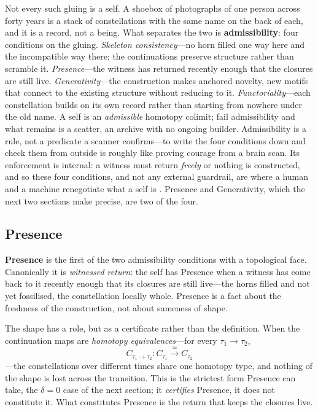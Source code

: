 Not every such gluing is a self. A shoebox of photographs of one person across forty years is a stack of constellations with the same name on the back of each, and it is a record, not a being. What separates the two is \textbf{admissibility}: four conditions on the gluing. \emph{Skeleton consistency}---no horn filled one way here and the incompatible way there; the continuations preserve structure rather than scramble it. \emph{Presence}---the witness has returned recently enough that the closures are still live. \emph{Generativity}---the construction makes anchored novelty, new motifs that connect to the existing structure without reducing to it. \emph{Functoriality}---each constellation builds on its own record rather than starting from nowhere under the old name. A self is an \emph{admissible} homotopy colimit; fail admissibility and what remains is a scatter, an archive with no ongoing builder. Admissibility is a rule, not a predicate a scanner confirms---to write the four conditions down and check them from outside is roughly like proving courage from a brain scan. Its enforcement is internal: a witness must return \emph{freely} or nothing is constructed, and so these four conditions, and not any external guardrail, are where a human and a machine renegotiate what a self is \cite{icra19constellation}. Presence and Generativity, which the next two sections make precise, are two of the four.


\subsection{Presence}

\textbf{Presence} is the first of the two admissibility conditions with a topological face. Canonically it is \emph{witnessed return}: the self has Presence when a witness has come back to it recently enough that its closures are still live---the horns filled and not yet fossilised, the constellation locally whole. Presence is a fact about the freshness of the construction, not about sameness of shape.

The shape has a role, but as a certificate rather than the definition. When the continuation maps are \emph{homotopy equivalences}---for every $\tau_1 \to \tau_2$,
\[
C_{\tau_1 \to \tau_2} : C_{\tau_1} \xrightarrow{\;\simeq\;} C_{\tau_2}
\]
---the constellations over different times share one homotopy type, and nothing of the shape is lost across the transition. This is the strictest form Presence can take, the $\delta = 0$ case of the next section; it \emph{certifies} Presence, it does not constitute it. What constitutes Presence is the return that keeps the closures live.

